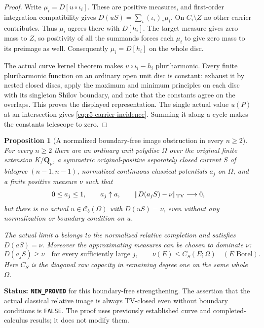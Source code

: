 \documentclass[11pt,a4paper]{article}
\numberwithin{equation}{section}
\newtheorem{proposition}[theorem]{Proposition}
\theoremstyle{definition}
\theoremstyle{remark}
\begin{document}
\begin{proof}
Write $\mu_i=D[u\circ\iota_i]$.  These are positive measures,
and first-order integration compatibility gives
$D(uS)=\sum_i(\iota_i)_*\mu_i$.  On $C_i\setminus Z$ no
other carrier contributes.  Thus $\mu_i$ agrees there with
$D[h_i]$.  The target measure gives zero mass to $Z$, so
positivity of all the summands forces each $\mu_i$ to give
zero mass to its preimage as well.  Consequently
$\mu_i=D[h_i]$ on the whole disc.

The actual curve kernel theorem makes $u\circ\iota_i-h_i$
pluriharmonic.  Every finite pluriharmonic function on an
ordinary open unit disc is constant: exhaust it by nested
closed discs, apply the maximum and minimum principles on
each disc with its singleton Shilov boundary, and note that
the constants agree on the overlaps.  This proves the
displayed representation.  The single actual value $u(P)$
at an intersection gives \eqref{eq:r5-carrier-incidence}.
Summing it along a cycle makes the constants telescope to
zero.
\end{proof}

\begin{proposition}[A normalized boundary-free image obstruction in every $n\ge2$]
\label{prop:r5-two-intersection-tv-obstruction}
For every $n\ge2$ there are an ordinary unit polydisc
$\Omega$ over the original finite extension $K/\mathbf Q_p$,
a symmetric original-positive separately closed current $S$
of bidegree $(n-1,n-1)$, normalized continuous classical
potentials $a_j$ on $\Omega$, and a finite positive measure
$\nu$ such that
\[
 0\le a_j\le1,\qquad a_j\uparrow a,\qquad
          \|D(a_jS)-\nu\|_{\rm TV}\longrightarrow0,
\]
but there is no actual $u\in\mathcal C_b(\Omega)$ with
$D(uS)=\nu$, even without any normalization or boundary
condition on $u$.

The actual limit $a$ belongs to the normalized relative
completion and satisfies $D(aS)=\nu$.  Moreover the
approximating measures can be chosen to dominate $\nu$:
\begin{equation}
 D(a_jS)\ge\nu\quad\text{for every sufficiently large }j,
 \qquad
 \nu(E)\le C_S(E;\Omega)\quad(E\text{ Borel}).
 \label{eq:r5-two-intersection-cap-bound}
\end{equation}
Here $C_S$ is the diagonal raw capacity in remaining degree
one on the same whole $\Omega$.
\end{proposition}

\noindent\textbf{Status: \texttt{NEW\_PROVED}} for this
boundary-free strengthening.  The assertion that the actual
classical relative image is always TV-closed even without
boundary conditions is \texttt{FALSE}.  The proof uses
previously established curve and completed-calculus results;
it does not modify them.
\end{document}
